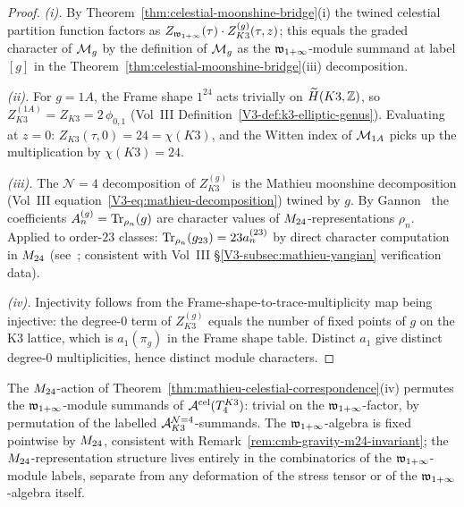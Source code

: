 \begin{proof}
\emph{(i).}
By Theorem~\ref{thm:celestial-moonshine-bridge}(i) the twined celestial
partition function factors as $Z_{\mathfrak w_{1+\infty}}(\tau) \cdot Z_{K3}^{(g)}(\tau,
z)$; this equals the graded character of $\mathcal M_g$ by the definition of
$\mathcal M_g$ as the $\mathfrak w_{1+\infty}$-module summand at label $[g]$ in the
Theorem~\ref{thm:celestial-moonshine-bridge}(iii) decomposition.

\emph{(ii).}
For $g = 1A$, the Frame shape $1^{24}$ acts trivially on
$\widetilde H(K3, \mathbb Z)$, so $Z_{K3}^{(1A)} = Z_{K3} = 2\,\phi_{0,1}$
(Vol~III Definition~\ref{V3-def:k3-elliptic-genus}). Evaluating at
$z = 0$: $Z_{K3}(\tau, 0) = 24 = \chi(K3)$, and the Witten index of
$\mathcal M_{1A}$ picks up the multiplication by $\chi(K3) = 24$.

\emph{(iii).}
The $\mathcal{N}{=}4$ decomposition of $Z_{K3}^{(g)}$ is the Mathieu
moonshine decomposition
(Vol~III equation~\eqref{V3-eq:mathieu-decomposition}) twined by $g$. By
Gannon~\cite{Gannon16} the coefficients $A_n^{(g)} = \operatorname{Tr}_{\rho_n}(g)$
are character values of $M_{24}$-representations $\rho_n$. Applied
to order-$23$ classes: $\operatorname{Tr}_{\rho_n}(g_{23}) = 23 a_n^{(23)}$ by direct
character computation in $M_{24}$
(see~\cite[Table 2]{EguchiOoguriTachikawa10}; consistent with Vol~III
\S\ref{V3-subsec:mathieu-yangian} verification data).

\emph{(iv).}
Injectivity follows from the Frame-shape-to-trace-multiplicity map
being injective: the degree-$0$ term of $Z_{K3}^{(g)}$ equals the
number of fixed points of $g$ on the K3 lattice, which is $a_1(\pi_g)$
in the Frame shape table. Distinct $a_1$ give distinct degree-$0$
multiplicities, hence distinct module characters.
\end{proof}

\begin{remark}
\label{rem:cmb-permutation-not-deformation}
The $M_{24}$-action of Theorem~\ref{thm:mathieu-celestial-correspondence}(iv)
permutes the $\mathfrak w_{1+\infty}$-module summands of $\mathcal A^{\mathrm{cel}}(T_4^{K3})$: trivial on the
$\mathfrak w_{1+\infty}$-factor, by permutation of the labelled
$\mathcal A^{\mathcal{N}{=}4}_{K3}$-summands. The $\mathfrak w_{1+\infty}$-algebra is fixed
pointwise by $M_{24}$, consistent with
Remark~\ref{rem:cmb-gravity-m24-invariant}; the
$M_{24}$-representation structure lives entirely in the combinatorics
of the $\mathfrak w_{1+\infty}$-module labels, separate from any deformation of the
stress tensor or of the $\mathfrak w_{1+\infty}$-algebra itself.
\end{remark}

